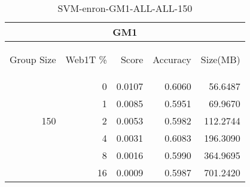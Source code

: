 \begin{center}
\begin{table}[htbp] 
 \begin{center}
\begin{tabular}{ | r | r | r | r | r |}
\hline
\multicolumn{5}{|c|}{GM1}\\
\hline
\begin{sideways}Group Size\end{sideways} & \begin{sideways}Web1T \%\end{sideways} & \begin{sideways}Score\end{sideways} & \begin{sideways}Accuracy\end{sideways} & \begin{sideways}Size(MB)\end{sideways}\\
\hline
\multirow{5}{*}{150}
 & 0 & 0.0107 & 0.6060 & 56.6487\\ \cline{2-5}
 & 1 & 0.0085 & 0.5951 & 69.9670\\ \cline{2-5}
 & 2 & 0.0053 & 0.5982 & 112.2744\\ \cline{2-5}
 & 4 & 0.0031 & 0.6083 & 196.3090\\ \cline{2-5}
 & 8 & 0.0016 & 0.5990 & 364.9695\\ \cline{2-5}
 & 16 & 0.0009 & 0.5987 & 701.2420\\ \cline{2-5}
\hline
\end{tabular}
\caption{SVM-enron-GM1-ALL-ALL-150}
\label{table:SVM-enron-GM1-ALL-ALL-150}
\end{center}
 \end{table}
\end{center}

